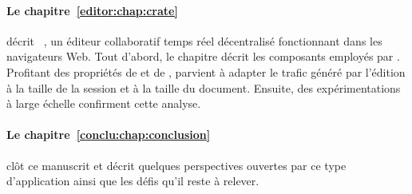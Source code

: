 \paragraph{Le chapitre~\ref{editor:chap:crate}} décrit
\CRATE~\cite{nedelec2016crate}, un éditeur collaboratif temps réel décentralisé
fonctionnant dans les navigateurs Web.  Tout d'abord,
le chapitre décrit les composants employés par \CRATE.  Profitant des propriétés
de \SPRAY et de \LSEQ, \CRATE parvient à adapter le trafic généré par l'édition
à la taille de la session et à la taille du document. Ensuite, des
expérimentations à large échelle confirment cette analyse.

\paragraph{Le chapitre~\ref{conclu:chap:conclusion}} clôt ce manuscrit et décrit
quelques perspectives ouvertes par ce type d'application ainsi que les défis
qu'il reste à relever.


